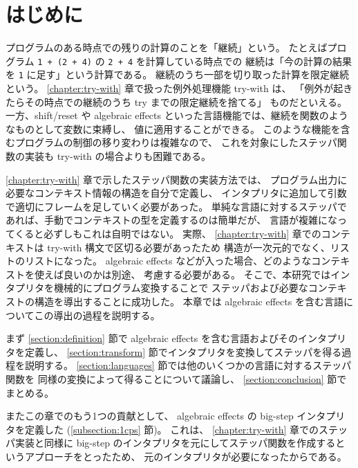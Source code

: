 \section{はじめに}
\label{section:algebraic effects__intro}

プログラムのある時点での残りの計算のことを「継続」という。
たとえばプログラム \texttt{1 + (2 + 4)} の \texttt{2 + 4} を計算している時点での
継続は「今の計算の結果を \texttt{1} に足す」という計算である。
継続のうち一部を切り取った計算を限定継続という。
\ref{chapter:try-with} 章で扱った例外処理機能 try-with は、
「例外が起きたらその時点での継続のうち try までの限定継続を捨てる」
ものだといえる。
一方、shift/reset \cite{DF1990} や algebraic effects \cite{PRETNAR201519}
といった言語機能では、継続を関数のようなものとして変数に束縛し、
値に適用することができる。
このような機能を含むプログラムの制御の移り変わりは複雑なので、
これを対象にしたステッパ関数の実装も try-with の場合よりも困難である。

\ref{chapter:try-with} 章で示したステッパ関数の実装方法では、
プログラム出力に必要なコンテキスト情報の構造を自分で定義し、
インタプリタに追加して引数で適切にフレームを足していく必要があった。
単純な言語に対するステッパであれば、手動でコンテキストの型を定義するのは簡単だが、
言語が複雑になってくると必ずしもこれは自明ではない。
実際、 \ref{chapter:try-with} 章でのコンテキストは try-with 構文で区切る必要があったため
構造が一次元的でなく、リストのリストになった。
algebraic effects などが入った場合、どのようなコンテキストを使えば良いのかは別途、
考慮する必要がある。
そこで、本研究ではインタプリタを機械的にプログラム変換することで
ステッパおよび必要なコンテキストの構造を導出することに成功した。
本章では algebraic effects を含む言語についてこの導出の過程を説明する。

まず \ref{section:definition} 節で algebraic effects を含む言語およびそのインタプリタを定義し、
\ref{section:transform} 節でインタプリタを変換してステッパを得る過程を説明する。
\ref{section:languages} 節では他のいくつかの言語に対するステッパ関数を
同様の変換によって得ることについて議論し、
\ref{section:conclusion} 節でまとめる。

またこの章でのもう1つの貢献として、
algebraic effects の big-step インタプリタを定義した (\ref{subsection:1cps} 節)。
これは、 \ref{chapter:try-with} 章でのステッパ実装と同様に
big-step のインタプリタを元にしてステッパ関数を作成するというアプローチをとったため、
元のインタプリタが必要になったからである。
